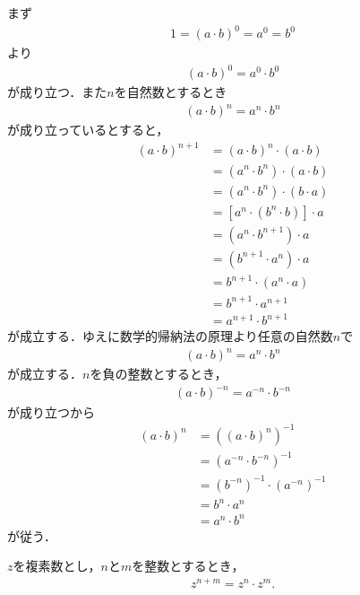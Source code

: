 	\begin{sketch}
		まず
		\begin{align}
			1 = (a \cdot b)^0 = a^0 = b^0
		\end{align}
		より
		\begin{align}
			(a \cdot b)^0 = a^0 \cdot b^0
		\end{align}
		が成り立つ．また$n$を自然数とするとき
		\begin{align}
			(a \cdot b)^n = a^n \cdot b^n
		\end{align}
		が成り立っているとすると，
		\begin{align}
			(a \cdot b)^{n+1}
			&= (a \cdot b)^n \cdot (a \cdot b) \\
			&= (a^n \cdot b^n) \cdot (a \cdot b) \\
			&= (a^n \cdot b^n) \cdot (b \cdot a) \\
			&= \left[a^n \cdot (b^n \cdot b)\right] \cdot a \\
			&= (a^n \cdot b^{n+1}) \cdot a \\
			&= (b^{n+1} \cdot a^n) \cdot a \\
			&= b^{n+1} \cdot (a^n \cdot a) \\
			&= b^{n+1} \cdot a^{n+1} \\
			&= a^{n+1} \cdot b^{n+1}
		\end{align}
		が成立する．ゆえに数学的帰納法の原理より任意の自然数$n$で
		\begin{align}
			(a \cdot b)^n = a^n \cdot b^n
		\end{align}
		が成立する．$n$を負の整数とするとき，
		\begin{align}
			(a \cdot b)^{-n} = a^{-n} \cdot b^{-n}
		\end{align}
		が成り立つから
		\begin{align}
			(a \cdot b)^n &= ((a \cdot b)^n)^{-1} \\
			&= (a^{-n} \cdot b^{-n})^{-1} \\
			&= (b^{-n})^{-1} \cdot (a^{-n})^{-1} \\
			&= b^n \cdot a^n \\
			&= a^n \cdot b^n
		\end{align}
		が従う．
		\QED
	\end{sketch}
	
	\begin{screen}
		\begin{thm}
		\label{thm:exponential_law_of_complex_numbers}
			$z$を複素数とし，$n$と$m$を整数とするとき，
			\begin{align}
				z^{n+m} = z^n \cdot z^m.
			\end{align}
		\end{thm}
	\end{screen}
	
